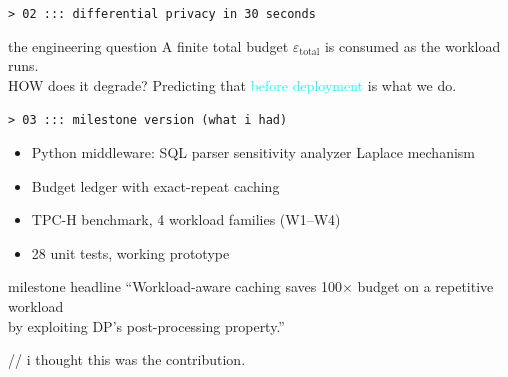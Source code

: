 \documentclass[aspectratio=169,10pt]{beamer}
\newcommand{\eps}{\varepsilon}
\renewcommand{\emph}[1]{\textcolor{cyan}{#1}}
\newcommand{\hi}[1]{\textcolor{neon}{#1}}
\begin{document}
\begin{frame}{\texttt{> 02 ::: differential privacy in 30 seconds}}
\vspace{0.4em}
\begin{alertblock}{\ttfamily\small the engineering question}
\small A finite total budget $\eps_\text{total}$ is consumed as the workload runs. \\[0.1em]
\hi{HOW does it degrade?} Predicting that \emph{before deployment} is what we do.
\end{alertblock}

\end{frame}

\begin{frame}{\texttt{> 03 ::: milestone version (what i had)}}

\begin{itemize}
  \item Python middleware: SQL parser \;{\color{dim}+}\; sensitivity analyzer \;{\color{dim}+}\; Laplace mechanism
  \item Budget ledger with \hi{exact-repeat caching}
  \item TPC-H benchmark, 4 workload families (W1--W4)
  \item 28 unit tests, working prototype
\end{itemize}

\vspace{0.6em}
\begin{block}{\ttfamily milestone headline}
``Workload-aware caching saves \hi{100$\times$ budget} on a repetitive workload \\
by exploiting DP's post-processing property.''
\end{block}

\vspace{0.6em}
{\color{dim}\ttfamily // i thought this was the contribution.}

\end{frame}
\end{document}
